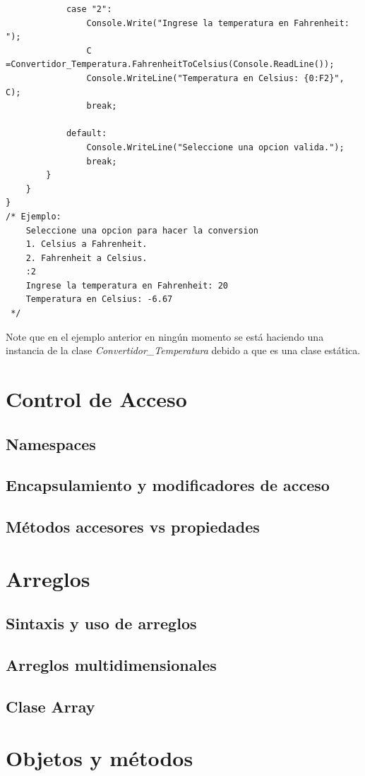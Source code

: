 \documentclass[12pt,a4paper]{report}
\begin{document}
\begin{lstlisting}
            case "2":
                Console.Write("Ingrese la temperatura en Fahrenheit:  ");
                C =Convertidor_Temperatura.FahrenheitToCelsius(Console.ReadLine());
                Console.WriteLine("Temperatura en Celsius: {0:F2}", C);
                break;

            default:
                Console.WriteLine("Seleccione una opcion valida.");
                break;
        }
    }
}
/* Ejemplo:
	Seleccione una opcion para hacer la conversion
    1. Celsius a Fahrenheit.
    2. Fahrenheit a Celsius.
    :2
    Ingrese la temperatura en Fahrenheit: 20
    Temperatura en Celsius: -6.67
 */
\end{lstlisting}
Note que en el ejemplo anterior en ningún momento se está haciendo una instancia de la clase \textit{Convertidor\_Temperatura} debido a que es una clase estática.

\chapter{Control de Acceso}
\section{Namespaces}
\section{Encapsulamiento y modificadores de acceso}
\section{Métodos accesores vs propiedades}

\chapter{Arreglos}
\section{Sintaxis y uso de arreglos}
\section{Arreglos multidimensionales}
\section{Clase Array}

\chapter{Objetos y métodos}
\end{document}
